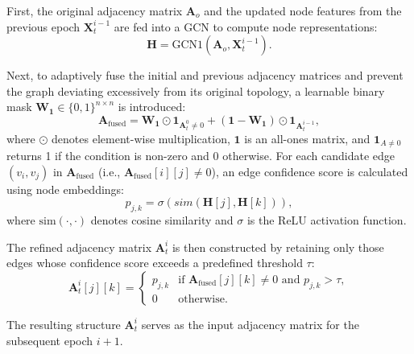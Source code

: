 \documentclass[sigconf, anonymous, review]{acmart}
\begin{document}
      First, the original adjacency matrix $\mathbf{A}_o$ and the updated node features from the previous epoch $\mathbf{X}_t^{i-1}$ are fed into a GCN to compute node representations:
      \begin{equation}
        \label{eq:rep}
        \mathbf{H} = \text{GCN1}(\mathbf{A}_o, \mathbf{X}_t^{i-1}).
      \end{equation}

      Next, to adaptively fuse the initial and previous adjacency matrices and prevent the graph deviating excessively from its original topology, a learnable binary mask $\mathbf{W_1} \in \{0,1\}^{n \times n}$ is introduced:
      \begin{equation}
        \mathbf{A}_{\text{fused}} = \mathbf{W_1} \odot \mathbf{1}_{\mathbf{A}_t^{0}\neq 0}  + (\mathbf{1} - \mathbf{W_1}) \odot \mathbf{1}_{\mathbf{A}_t^{i-1}},
      \end{equation}
      where $\odot$ denotes element-wise multiplication, $\mathbf{1}$ is an all-ones matrix, and $\mathbf{1}_{A\neq 0}$ returns 1 if the condition is non-zero  and 0 otherwise. 
      For each candidate edge $(v_i,v_j)$ in $\mathbf{A}_{\text{fused}}$ (i.e., $\mathbf{A}_{\text{fused}}[i][j] \neq 0$), an edge confidence score is calculated using node embeddings:
      \begin{equation}
        p_{j,k} = \sigma(sim (\mathbf{H}[j], \mathbf{H}[k])),
      \end{equation}
      where $\text{sim}(\cdot,\cdot)$ denotes cosine similarity and $\sigma$ is the ReLU activation function.

      The refined adjacency matrix $\mathbf{A}_t^{i}$ is then constructed by retaining only those edges whose confidence score exceeds a predefined threshold $\tau$:
      \begin{equation}
        \label{eq:Ati}
        \mathbf{A}_t^{i}[j][k] =
        \begin{cases}
          p_{j,k} & \text{if } \mathbf{A}_{\text{fused}}[j][k] \neq 0 \text{ and } p_{j,k} > \tau, \\
          0 & \text{otherwise}.
        \end{cases}
      \end{equation}

      The resulting structure $\mathbf{A}_t^{i}$  serves as the input adjacency matrix for the subsequent epoch  $i+1$.
\end{document}
